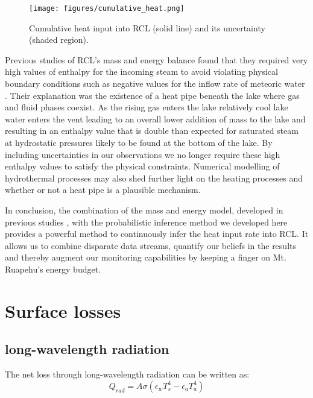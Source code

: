 \documentclass{bmc_template/bmcart}
\begin{document}
\begin{figure}
    \texttt{[image: figures/cumulative\_heat.png]}
    \caption{Cumulative heat input into RCL (solid line) and its 
    uncertainty (shaded region).}
    \label{cumheat}
\end{figure}

Previous studies of RCL's mass and energy balance found that they required very
high values of enthalpy for the incoming steam to avoid violating physical
boundary conditions such as negative values for the inflow rate of meteoric
water \cite{hurstCraterLakeEnergy2015, Stevenson1992}. Their explanation was the
existence of a heat pipe beneath the lake where gas and fluid phases coexist. As
the rising gas enters the lake relatively cool lake water enters the vent
leading to an overall lower addition of mass to the lake and resulting in an
enthalpy value that is double than expected for saturated steam at hydrostatic
pressures likely to be found at the bottom of the lake. By including
uncertainties in our observations we no longer require these high enthalpy
values to satisfy the physical constraints. Numerical modelling of hydrothermal
processes may also shed further light on the heating processes and whether or
not a heat pipe is a plausible mechanism.

In conclusion, the combination of the mass and energy model, developed in
previous studies \cite{hurstCraterLakeEnergy2015, Stevenson1992}, with the
probabilistic inference method we developed here provides a powerful method to
continuously infer the heat input rate into RCL. It allows us to combine
disparate data streams, quantify our beliefs in the results and thereby augment
our monitoring capabilities by keeping a finger on Mt. Ruapehu's energy budget.

\appendix
\section{Surface losses}\label{A}
\subsection{long-wavelength radiation}
The net loss through long-wavelength radiation can be written as:
\begin{equation}
    Q_{rad} = A\sigma(\epsilon_w T_s^4 - \epsilon_a T_a^4)
\end{equation}
\end{document}
